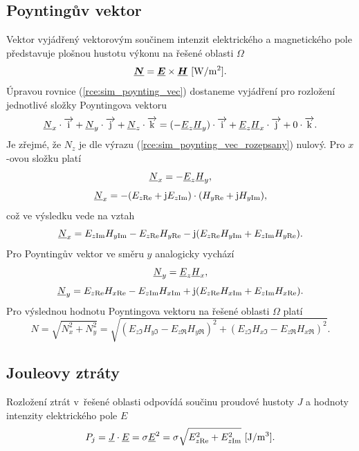 \subsection*{Poyntingův vektor}
Vektor vyjádřený vektorovým součinem intenzit elektrického a magnetického pole představuje plošnou hustotu výkonu na řešené oblasti $\Omega$
\begin{equation}
	\mbox{\underline{\boldmath$N$}} = \mbox{\underline{\boldmath$E$}} \times\mbox{\underline{\boldmath$H$}}\mathrm{\ [W/m^{2}]}.
	\label{rce:sim_poynting_vec}
\end{equation}
Úpravou rovnice (\ref{rce:sim_poynting_vec}) dostaneme vyjádření pro rozložení jednotlivé složky Poyntingova vektoru
\begin{equation}
	{\underline{N}}_x \cdot\overrightarrow{\mathrm{i}} + {\underline{N}}_y \cdot\overrightarrow{\mathrm{j}} + {\underline{N}}_z \cdot\overrightarrow{\mathrm{k}} = (-{\underline{E}}_z {\underline{H}}_y) \cdot\overrightarrow{\mathrm{i}} + {\underline{E}}_z {\underline{H}}_x \cdot\overrightarrow{\mathrm{j}} + 0 \cdot\overrightarrow{\mathrm{k}}.
	\label{rce:sim_poynting_vec_rozepsany}
\end{equation}
Je zřejmé, že $N_z$ je dle výrazu (\ref{rce:sim_poynting_vec_rozepsany}) nulový. Pro $x$-ovou složku platí
\begin{displaymath}
	{\underline{N}}_x = -{\underline{E}}_z {\underline{H}}_y,
\end{displaymath}
\begin{displaymath}
	{\underline{N}}_x = -(E_{z\mathrm{Re}} + \mathrm{j} E_{z\mathrm{Im}})\cdot (H_{y\mathrm{Re}} + \mathrm{j} H_{y\mathrm{Im}}),
\end{displaymath}
což ve výsledku vede na vztah
\begin{displaymath}
	{\underline{N}}_x = E_{z\mathrm{Im}} H_{y\mathrm{Im}} - E_{z\mathrm{Re}} H_{y\mathrm{Re}} - \mathrm{j} (E_{z\mathrm{Re}} H_{y\mathrm{Im}} + E_{z\mathrm{Im}} H_{y\mathrm{Re}}).
\end{displaymath}
Pro Poyntingův vektor ve směru $y$ analogicky vychází
\begin{displaymath}
	{\underline{N}}_y = {\underline{E}}_z {\underline{H}}_x,
\end{displaymath}
\begin{displaymath}
	{\underline{N}}_y = E_{z\mathrm{Re}} H_{x\mathrm{Re}} - E_{z\mathrm{Im}} H_{x\mathrm{Im}} + \mathrm{j} (E_{z\mathrm{Re}} H_{x\mathrm{Im}} + E_{z\mathrm{Im}} H_{x\mathrm{Re}}).
\end{displaymath}
Pro výslednou hodnotu Poyntingova vektoru na řešené oblasti $\Omega$ platí
\begin{displaymath}
	N = \sqrt{N_{x}^{2} + N_{y}^{2}} = \sqrt{(E_{z\Im} H_{y\Im} - E_{z\Re} H_{y\Re})^{2} + (E_{z\Im} H_{x\Im} - E_{z\Re} H_{x\Re})^{2}}.
\end{displaymath}

\subsection*{Jouleovy ztráty}
Rozložení ztrát v~řešené oblasti odpovídá součinu proudové hustoty $J$ a hodnoty intenzity elektrického pole $E$ 
\begin{displaymath}
	P_j = {\underline{J}} \cdot {\underline{E}} = \sigma {\underline{E}}^{2} = \sigma \sqrt{E_{z\mathrm{Re}}^{2} + E_{z\mathrm{Im}}^{2}}\mathrm{\ [J/m^{3}]}.
\end{displaymath}

